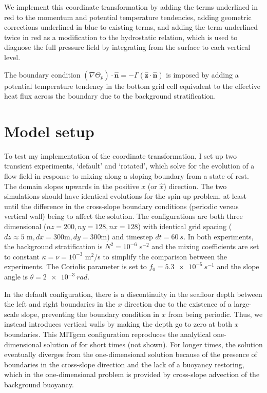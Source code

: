 \documentclass{article}
\begin{document}
We implement this coordinate transformation by adding the terms underlined in red to the momentum and potential temperature tendencies, adding geometric corrections underlined in blue to existing terms, and adding the term underlined twice in red as a modification to the hydrostatic relation, which is used to diagnose the full pressure field by integrating from the surface to each vertical level.

The boundary condition $( \nabla \Theta_{p}) \cdot \hat{\bm{n}} = - \Gamma (\hat{\bm{z}} \cdot \hat{\bm{n}})$ is imposed by adding a potential temperature tendency in the bottom grid cell equivalent to the effective heat flux across the boundary due to the background stratification.

\section{Model setup}

To test my implementation of the coordinate transformation, I set up two transient experiments, `default' and `rotated', which solve for the evolution of a flow field in response to mixing along a sloping boundary from a state of rest. The domain slopes upwards in the positive $x$ (or $\hat{x}$) direction. The two simulations should have identical evolutions for the spin-up problem, at least until the difference in the cross-slope boundary conditions (periodic versus vertical wall) being to affect the solution. The configurations are both three dimensional ($nz = 200, ny = 128, nx = 128$) with identical grid spacing ($dz \approx 5 \text{ m}, dx = 300 \text{m}, dy = 300 \text{m}$) and timestep $dt=\SI{60}{s}$. In both experiments, the background stratification is $N^{2} = 10^{-6}$ s$^{-2}$ and the mixing coefficients are set to constant $\kappa = \nu = 10^{-3}$ m$^{2}$/s to simplify the comparison between the experiments. The Coriolis parameter is set to $f_{0} = \SI{5.3e-5}{s^{-1}}$ and the slope angle is $\theta = \SI{2e-3}{rad}$.

In the default configuration, there is a discontinuity in the seafloor depth between the left and right boundaries in the $x$ direction due to the existence of a large-scale slope, preventing the boundary condition in $x$ from being periodic. Thus, we instead introduces vertical walls by making the depth go to zero at both $x$ boundaries. This MITgcm configuration reproduces the analytical one-dimensional solution of \cite{Garrett1990TheMixing} for short times (not shown). For longer times, the solution eventually diverges from the one-dimensional solution because of the presence of boundaries in the cross-slope direction and the lack of a buoyancy restoring, which in the one-dimensional problem is provided by cross-slope advection of the background buoyancy.
\end{document}
